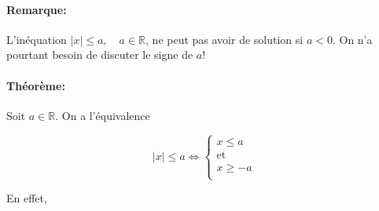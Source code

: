 \documentclass[
    11pt,
    a4paper,
    oneside,
    headinlcude, footinclude,
    twoside,
]{report}
\begin{document}
\paragraph{Remarque:}

L'in\'equation $|x| \leq a, \quad a \in \mathbb{R}$, ne peut pas avoir de
solution si $a < 0$. On n'a pourtant besoin de discuter le signe de $a$!

\paragraph{Théorème:}

Soit $a \in \mathbb{R}$. On a l'\'equivalence

$$|x| \leq a \iff \left\{
    \begin{array}{l}
    x \leq a\\
    \text{et } \\
    x \geq -a\\
    \end{array}
\right.$$

En effet,
\end{document}
